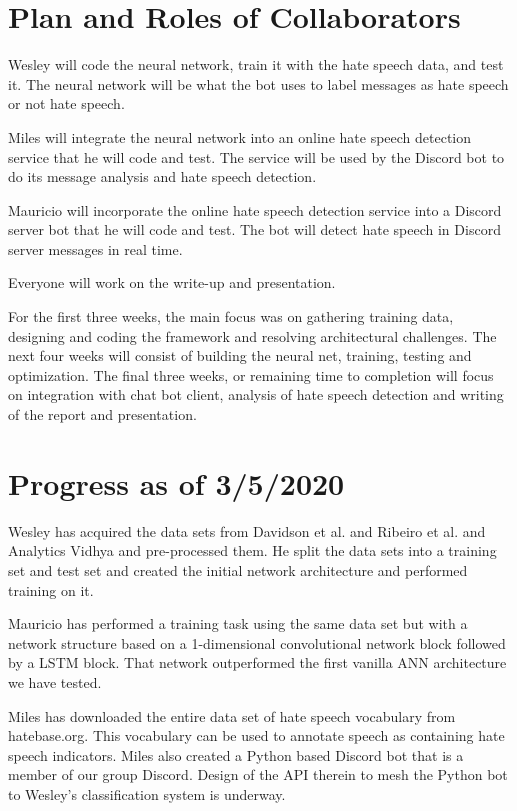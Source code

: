 \documentclass[conference]{sig-alternate-05-2015}
\begin{document}
\section{Plan and Roles of Collaborators}

Wesley will code the neural network, train it with the hate speech data, and test it. The neural network will be what the bot uses to label messages as hate speech or not hate speech.

Miles will integrate the neural network into an online hate speech detection service that he will code and test. The service will be used by the Discord bot to do its message analysis and hate speech detection. 

Mauricio will incorporate the online hate speech detection service into a Discord server bot that he will code and test. The bot will detect hate speech in Discord server messages in real time.

Everyone will work on the write-up and presentation.

For the first three weeks, the main focus was on gathering training data, designing and coding the framework and resolving architectural challenges.  The next four weeks will consist of building the neural net, training, testing and optimization.  The final three weeks, or remaining time to completion will focus on integration with chat bot client, analysis of hate speech detection and writing of the report and presentation.

\section{Progress as of 3/5/2020}

Wesley has acquired the data sets from Davidson et al. and Ribeiro et al. and Analytics Vidhya and pre-processed them. He split the data sets into a training set and test set and created the initial network architecture and performed training on it.

Mauricio has performed a training task using the same data set but with a network structure based on a 1-dimensional convolutional network block followed by a LSTM block. That network outperformed the first vanilla ANN architecture we have tested.

Miles has downloaded the entire data set of hate speech vocabulary from hatebase.org.  This vocabulary can be used to annotate speech as containing hate speech indicators.  Miles also created a Python based Discord bot that is a member of our group Discord.  Design of the API therein to mesh the Python bot to Wesley's classification system is underway.
\end{document}

